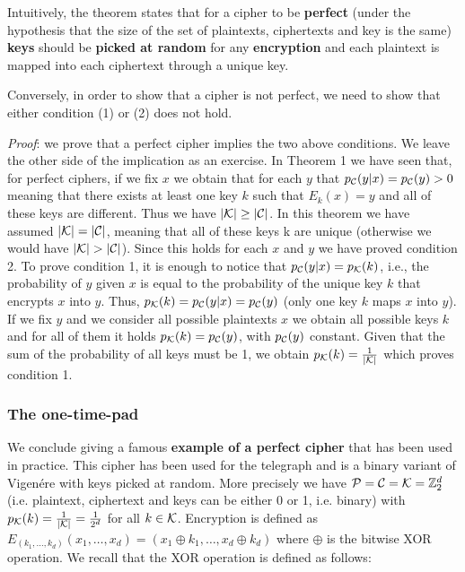 
Intuitively, the theorem states that for a cipher to be \textbf{perfect} (under the hypothesis that the size of the set of plaintexts, ciphertexts and key is the same) \textbf{keys} should be \textbf{picked at random} for any \textbf{encryption} and each plaintext is mapped into each ciphertext through a unique key.

Conversely, in order to show that a cipher is not perfect, we need to show that either condition (1) or (2) does not hold.

\textit{Proof}: we prove that a perfect cipher implies the two above conditions. We leave the other side of the implication as an exercise. In Theorem 1 we have seen that, for perfect ciphers, if we fix $x$ we obtain that for each $y$ that $p_{\cal C}(y|x)=p_{\cal C}(y)>0$ meaning that there exists at least one key $k$ such that $E_k(x) = y$ and all of these keys are different. Thus we have $|{\cal K}| \geq |{\cal C}|$. In this theorem we have assumed $|{\cal K}| = |{\cal C}|$, meaning that all of these keys k are unique (otherwise we would have $|{\cal K}| > |{\cal C}|$). Since this holds for each $x$ and $y$ we have proved condition 2. To prove condition 1, it is enough to notice that $p_{\cal C}(y|x)=p_{\cal K}(k)$, i.e., the probability of $y$ given $x$ is equal to the probability of the unique key $k$ that encrypts $x$ into $y$. Thus, $p_{\cal K}(k) = p_{\cal C}(y|x)=p_{\cal C}(y)$ (only one key $k$ maps $x$ into $y$). If we fix $y$ and we consider all possible plaintexts $x$ we obtain all possible keys $k$ and for all of them it holds $p_{\cal K}(k) =p_{\cal C}(y)$, with $p_{\cal C}(y)$ constant. Given that the sum of the probability of all keys must be 1, we obtain $p_{\cal K}(k) = \frac{1}{|{\cal K}|}$ which proves condition 1.

\subsubsection{The one-time-pad}
We conclude giving a famous \textbf{example of a perfect cipher} that has been used in practice. This cipher has been used for the telegraph and is a binary variant of Vigenére with keys picked at random. More precisely we have ${\cal P} = {\cal C}= {\cal K} = \mathbb{Z}_2^d$ (i.e. plaintext, ciphertext and keys can be either 0 or 1, i.e. binary) with $p_{\cal K}(k) = \frac{1}{|{\cal K}|} = \frac{1}{2^d}$ for all $k \in {\cal K}$. Encryption is defined as $E_{(k_1, \ldots, k_d)}(x_1,\ldots,x_d) = (x_1 \oplus k_1, \ldots, x_d \oplus k_d)$ where $\oplus$ is the bitwise XOR operation. We recall that the XOR operation is defined as follows: 

